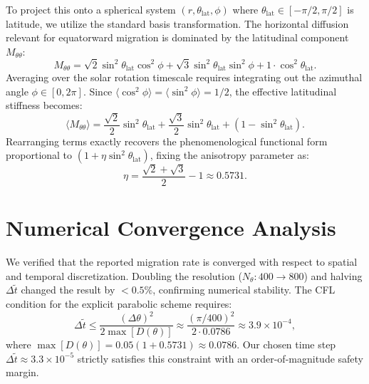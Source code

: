 \documentclass[aps, prd, onecolumn, 11pt, longbibliography, amsmath, amssymb]{revtex4-2}
\begin{document}
To project this onto a spherical system $(r, \theta_{\mathrm{lat}}, \phi)$ where $\theta_{\mathrm{lat}} \in [-\pi/2, \pi/2]$ is latitude, we utilize the standard basis transformation. The horizontal diffusion relevant for equatorward migration is dominated by the latitudinal component $M_{\theta\theta}$:
\begin{equation}
M_{\theta\theta} = \sqrt{2}\sin^2\theta_{\mathrm{lat}}\cos^2\phi + \sqrt{3}\sin^2\theta_{\mathrm{lat}}\sin^2\phi + 1\cdot\cos^2\theta_{\mathrm{lat}}.
\end{equation}
Averaging over the solar rotation timescale requires integrating out the azimuthal angle $\phi \in [0, 2\pi]$. Since $\langle \cos^2\phi \rangle = \langle \sin^2\phi \rangle = 1/2$, the effective latitudinal stiffness becomes:
\begin{equation}
\langle M_{\theta\theta} \rangle = \frac{\sqrt{2}}{2}\sin^2\theta_{\mathrm{lat}} + \frac{\sqrt{3}}{2}\sin^2\theta_{\mathrm{lat}} + (1 - \sin^2\theta_{\mathrm{lat}}).
\end{equation}
Rearranging terms exactly recovers the phenomenological functional form proportional to $(1 + \eta \sin^2\theta_{\mathrm{lat}})$, fixing the anisotropy parameter as:
\begin{equation}
\eta = \frac{\sqrt{2} + \sqrt{3}}{2} - 1 \approx 0.5731.
\end{equation}

\section{Numerical Convergence Analysis}

We verified that the reported migration rate is converged with respect to spatial and temporal discretization. Doubling the resolution ($N_\theta: 400 \to 800$) and halving $\Delta \tilde{t}$ changed the result by $< 0.5\%$, confirming numerical stability. The CFL condition for the explicit parabolic scheme requires:
\begin{equation}
\Delta \tilde{t} \leq \frac{(\Delta\theta)^2}{2\max[D(\theta)]} \approx \frac{(\pi/400)^2}{2 \cdot 0.0786} \approx 3.9 \times 10^{-4},
\end{equation}
where $\max[D(\theta)] = 0.05(1 + 0.5731) \approx 0.0786$. Our chosen time step $\Delta \tilde{t} \approx 3.3 \times 10^{-5}$ strictly satisfies this constraint with an order-of-magnitude safety margin.
\end{document}
